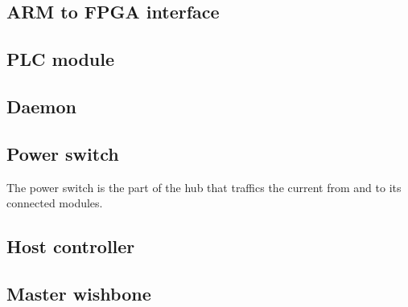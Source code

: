 \subsection{ARM to FPGA interface}



\subsection{PLC module}



\subsection{Daemon}



\subsection{Power switch}
The power switch is the part of the hub that traffics the current from and to its connected modules. 


\subsection{Host controller}



\subsection{Master wishbone}

